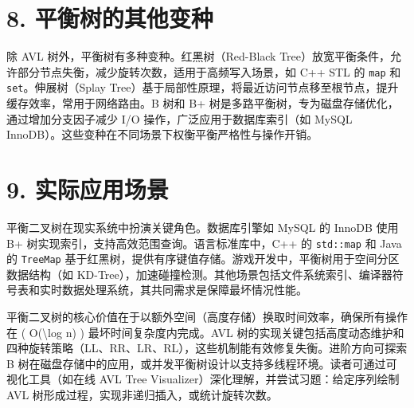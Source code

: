 \chapter{8. 平衡树的其他变种}
除 AVL 树外，平衡树有多种变种。红黑树（Red-Black Tree）放宽平衡条件，允许部分节点失衡，减少旋转次数，适用于高频写入场景，如 C++ STL 的 \texttt{map} 和 \texttt{set}。伸展树（Splay Tree）基于局部性原理，将最近访问节点移至根节点，提升缓存效率，常用于网络路由。B 树和 B+ 树是多路平衡树，专为磁盘存储优化，通过增加分支因子减少 I/O 操作，广泛应用于数据库索引（如 MySQL InnoDB）。这些变种在不同场景下权衡平衡严格性与操作开销。\par
\chapter{9. 实际应用场景}
平衡二叉树在现实系统中扮演关键角色。数据库引擎如 MySQL 的 InnoDB 使用 B+ 树实现索引，支持高效范围查询。语言标准库中，C++ 的 \texttt{std::map} 和 Java 的 \texttt{TreeMap} 基于红黑树，提供有序键值存储。游戏开发中，平衡树用于空间分区数据结构（如 KD-Tree），加速碰撞检测。其他场景包括文件系统索引、编译器符号表和实时数据处理系统，其共同需求是保障最坏情况性能。\par
平衡二叉树的核心价值在于以额外空间（高度存储）换取时间效率，确保所有操作在 ( O(\textbackslash{}log n) ) 最坏时间复杂度内完成。AVL 树的实现关键包括高度动态维护和四种旋转策略（LL、RR、LR、RL），这些机制能有效修复失衡。进阶方向可探索 B 树在磁盘存储中的应用，或并发平衡树设计以支持多线程环境。读者可通过可视化工具（如在线 AVL Tree Visualizer）深化理解，并尝试习题：给定序列绘制 AVL 树形成过程，实现非递归插入，或统计旋转次数。\par
